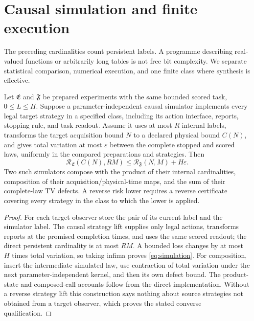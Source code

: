 \section{Causal simulation and finite execution}\label{sec:resources}
The preceding cardinalities count persistent labels. A programme describing real-valued functions or arbitrarily long tables is not free bit complexity. We separate statistical comparison, numerical execution, and one finite class where synthesis is effective.

\begin{proposition}\label{prop:simulation}
Let $\mathfrak E$ and $\mathfrak F$ be prepared experiments with the same bounded scored task, $0\le L\le H$. Suppose a parameter-independent causal simulator implements every legal target strategy in a specified class, including its action interface, reports, stopping rule, and task readout. Assume it uses at most $R$ internal labels, transforms the target acquisition bound $N$ to a declared physical bound $C(N)$, and gives total variation at most $\varepsilon$ between the complete stopped and scored laws, uniformly in the compared preparations and strategies. Then
\begin{equation}\label{eq:simulation}
 \mathcal R_{\mathfrak E}(C(N),RM)
 \le \mathcal R_{\mathfrak F}(N,M)+H\varepsilon.
\end{equation}
Two such simulators compose with the product of their internal cardinalities, composition of their acquisition/physical-time maps, and the sum of their complete-law TV defects. A reverse risk lower requires a reverse certificate covering every strategy in the class to which the lower is applied.
\end{proposition}
\begin{proof}
For each target observer store the pair of its current label and the simulator label. The causal strategy lift supplies only legal actions, transforms reports at the promised completion times, and uses the same scored readout; the direct persistent cardinality is at most $RM$. A bounded loss changes by at most $H$ times total variation, so taking infima proves \eqref{eq:simulation}. For composition, insert the intermediate simulated law, use contraction of total variation under the next parameter-independent kernel, and then its own defect bound. The product-state and composed-call accounts follow from the direct implementation. Without a reverse strategy lift this construction says nothing about source strategies not obtained from a target observer, which proves the stated converse qualification.
\end{proof}
